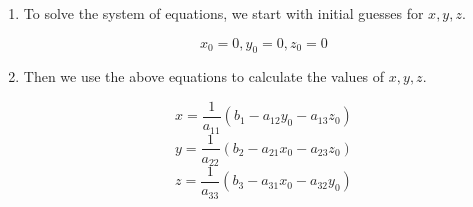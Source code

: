 \begin{enumerate}
    \item To solve the system of equations, we start with initial guesses for $x, y, z$.
  
    \begin {equation*}
      x_0 = 0, y_0 = 0, z_0 = 0
    \end{equation*}
  
    \item  Then we use the above equations to calculate the values of $x, y, z$.
  
    \begin{equation*}
      x = \frac{1}{a_{11}}(b_1 - a_{12}y_0 - a_{13}z_0)
    \end{equation*}
    \begin{equation*}
      y = \frac{1}{a_{22}}(b_2 - a_{21}x_0 - a_{23}z_0)
    \end{equation*}
    \begin{equation*}
      z = \frac{1}{a_{33}}(b_3 - a_{31}x_0 - a_{32}y_0)
    \end{equation*}


\end{enumerate}
  